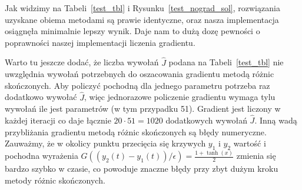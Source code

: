 \documentclass[11pt]{article}
\begin{document}
Jak widzimy na Tabeli~\ref{test_tbl} i Rysunku~\ref{test_nograd_sol}, rozwiązania uzyskane obiema metodami są prawie identyczne, oraz nasza implementacja osiągnęła minimalnie lepszy wynik. Daje nam to dużą dozę pewności o poprawności naszej implementacji liczenia gradientu.

Warto tu jeszcze dodać, że liczba wywołań $\hat{J}$ podana na Tabeli~\ref{test_tbl} nie uwzględnia wywołań potrzebnych do oszacowania gradientu metodą różnic skończonych. Aby policzyć pochodną dla jednego parametru potrzeba raz dodatkowo wywołać $\hat{J}$, więc jednorazowe policzenie gradientu wymaga tylu wywołań ile jest parametrów (w tym przypadku 51). Gradient jest liczony w każdej iteracji co daje łącznie $20\cdot 51 = 1020$ dodatkowych wywołań $\hat{J}$. Inną wadą przybliżania gradientu metodą różnic skończonych są błędy numeryczne. Zauważmy, że w okolicy punktu przecięcia się krzywych $y_1$ i $y_2$ wartość i pochodna wyrażenia $G((y_2(t) - y_1(t))/\epsilon) = \frac{1 + \tanh(x)}{2}$ zmienia się bardzo szybko w czasie, co powoduje znaczne błędy przy zbyt dużym kroku metody różnic skończonych.
\end{document}
